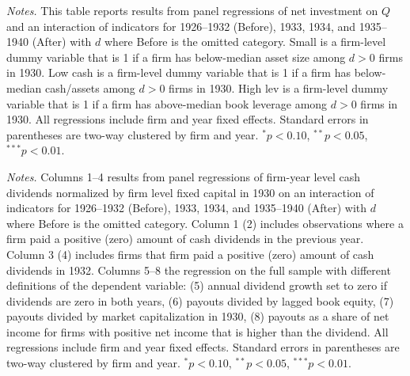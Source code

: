\begin{table}[p]
\centering
\caption{\\ Gold clause exposure and investment by firm size, cash, and book leverage } \scriptsize \renewcommand{\arraystretch}{1.15}

\label{tabapp:constraint}


\vspace*{3mm} \justifying \noindent
\footnotesize{\textit{Notes.} This table reports results from panel regressions of net investment on $Q$ and an interaction of indicators for 1926--1932 (Before), 1933, 1934, and 1935--1940 (After) with $d$ where Before is the omitted category. Small is a firm-level dummy variable that is 1 if a firm has below-median asset size among $d > 0$ firms in 1930. Low cash is a firm-level dummy variable that is 1 if a firm has below-median cash/assets among $d > 0$ firms in 1930. High lev is a firm-level dummy variable that is 1 if a firm has above-median book leverage among $d > 0$ firms in 1930. All regressions include firm and year fixed effects. Standard errors in parentheses are two-way clustered by firm and year. $^{*}p<0.10$, $^{**}p<0.05$, $^{***}p<0.01$.}
\end{table}

\begin{table}[p]\centering
\caption{\\ Additional analysis on dividends}
\footnotesize \label{tabapp:divadd}
\renewcommand{\arraystretch}{1.15}
\resizebox{1\textwidth}{!}{%

}

\vspace*{3mm} \justifying \noindent
\footnotesize{\textit{Notes.} Columns 1--4 results from panel regressions of firm-year level cash dividends normalized by firm level fixed capital in 1930 on an interaction of indicators for 1926--1932 (Before), 1933, 1934, and 1935--1940 (After) with $d$ where Before is the omitted category. Column 1 (2) includes observations where a firm paid a positive (zero) amount of cash dividends in the previous year. Column 3 (4) includes firms that firm paid a positive (zero) amount of cash dividends in 1932. Columns 5--8 the regression on the full sample with different definitions of the dependent variable: (5) annual dividend growth set to zero if dividends are zero in both years, (6) payouts divided by lagged book equity, (7) payouts divided by market capitalization in 1930, (8) payouts as a share of net income for firms with positive net income that is higher than the dividend. All regressions include firm and year fixed effects. Standard errors in parentheses are two-way clustered by firm and year. $^{*}p<0.10$, $^{**}p<0.05$, $^{***}p<0.01$.}


\end{table}


